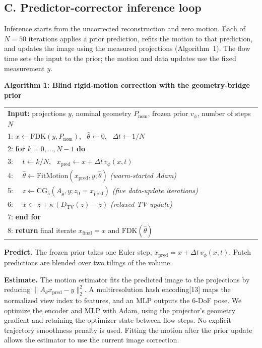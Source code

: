 \documentclass[11pt]{article}
\newcommand{\FDK}{\mathrm{FDK}}
\newcommand{\thetahat}{\hat\theta}
\newcommand{\Pnom}{P_{\mathrm{nom}}}
\begin{document}
\subsection{C. Predictor-corrector inference loop}


Inference starts from the uncorrected reconstruction and zero motion. Each of $N=50$
iterations applies a prior prediction, refits the motion to that prediction, and updates
the image using the measured projections (Algorithm~1). The flow time
sets the input to the prior; the motion and data updates use the fixed measurement $y$.

\textbf{Algorithm 1: Blind rigid-motion correction with the geometry-bridge prior}

\begin{tabular}{l}
\hline
\textbf{Input:} projections $y$, nominal geometry $\Pnom$, frozen prior $v_\phi$, number of steps $N$ \\
1: $x\gets\FDK(y,\Pnom)$,  $\thetahat\gets0$,  $\Delta t\gets1/N$ \\
2: \textbf{for} $k=0,\dots,N-1$ \textbf{do} \\
3:  $t\gets k/N$,  $x_{\mathrm{pred}}\gets x+\Delta t\,v_\phi(x,t)$ \\
4:  $\thetahat\gets\mathrm{FitMotion}(x_{\mathrm{pred}},y;\thetahat)$   \textit{(warm-started Adam)} \\
5:  $z\gets\mathrm{CG}_5(A_{\thetahat},y;z_0=x_{\mathrm{pred}})$   \textit{(five data-update iterations)} \\
6:  $x\gets z+\kappa\,(D_{\mathrm{TV}}(z)-z)$   \textit{(relaxed TV update)} \\
7: \textbf{end for} \\
8: \textbf{return} final iterate $x_{\mathrm{final}}=x$ and $\FDK(\thetahat)$ \\
\hline
\end{tabular}


\textbf{Predict.} The frozen prior takes one Euler step,
$x_{\mathrm{pred}}=x+\Delta t\,v_\phi(x,t)$. Patch predictions are blended over two
tilings of the volume.

\textbf{Estimate.} The motion estimator fits the predicted image to the projections
by reducing $\|A_\theta x_{\mathrm{pred}}-y\|_2^2$. A multiresolution hash
encoding[13] maps the normalized view index to features, and an MLP
outputs the 6-DoF pose. We optimize the encoder and MLP with Adam, using the
projector's geometry gradient and retaining the optimizer state between flow steps.
No explicit trajectory smoothness penalty is used. Fitting the motion after the prior
update allows the estimator to use the current image correction.
\end{document}

